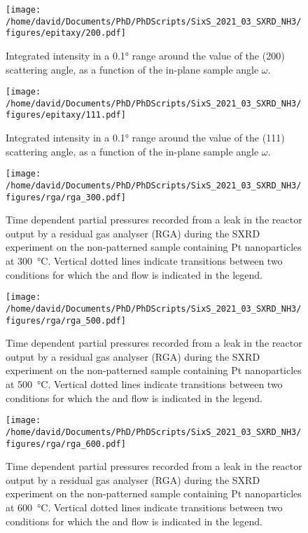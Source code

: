 \begin{figure}[!htb]
    \centering
    \texttt{[image: /home/david/Documents/PhD/PhDScripts/SixS\_2021\_03\_SXRD\_NH3/figures/epitaxy/200.pdf]}
    \caption{
        Integrated intensity in a \ang{0.1} range around the value of the (200) scattering angle, as a function of the in-plane sample angle $\omega$.
    }
    \label{fig:Epitaxy200}
\end{figure}

\begin{figure}[!htb]
    \centering
    \texttt{[image: /home/david/Documents/PhD/PhDScripts/SixS\_2021\_03\_SXRD\_NH3/figures/epitaxy/111.pdf]}
    \caption{
        Integrated intensity in a \ang{0.1} range around the value of the (111) scattering angle, as a function of the in-plane sample angle $\omega$.
    }
    \label{fig:Epitaxy111}
\end{figure}

\begin{figure}[!htb]
    \centering
    \texttt{[image: /home/david/Documents/PhD/PhDScripts/SixS\_2021\_03\_SXRD\_NH3/figures/rga/rga\_300.pdf]}
    \caption{
        Time dependent partial pressures recorded from a leak in the reactor output by a residual gas analyser (RGA) during the SXRD experiment on the non-patterned sample containing Pt nanoparticles at \qty{300}{\degreeCelsius}.
        Vertical dotted lines indicate transitions between two conditions for which the  and  flow is indicated in the legend.
    }
    \label{fig:RGA300SXRDNanoparticles}
\end{figure}

\begin{figure}[!htb]
    \centering
    \texttt{[image: /home/david/Documents/PhD/PhDScripts/SixS\_2021\_03\_SXRD\_NH3/figures/rga/rga\_500.pdf]}
    \caption{
        Time dependent partial pressures recorded from a leak in the reactor output by a residual gas analyser (RGA) during the SXRD experiment on the non-patterned sample containing Pt nanoparticles at \qty{500}{\degreeCelsius}.
        Vertical dotted lines indicate transitions between two conditions for which the  and  flow is indicated in the legend.
    }
    \label{fig:RGA500SXRDNanoparticles}
\end{figure}

\begin{figure}[!htb]
    \centering
    \texttt{[image: /home/david/Documents/PhD/PhDScripts/SixS\_2021\_03\_SXRD\_NH3/figures/rga/rga\_600.pdf]}
    \caption{
        Time dependent partial pressures recorded from a leak in the reactor output by a residual gas analyser (RGA) during the SXRD experiment on the non-patterned sample containing Pt nanoparticles at \qty{600}{\degreeCelsius}.
        Vertical dotted lines indicate transitions between two conditions for which the  and  flow is indicated in the legend.
    }
    \label{fig:RGA600SXRDNanoparticles}
\end{figure}

